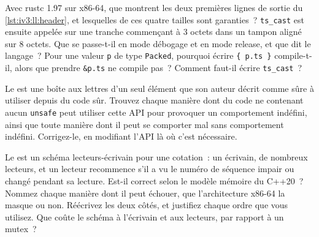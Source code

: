 \begin{question}\label{iq:iv3:low-latency:29}
Avec rustc 1.97 sur x86-64, que montrent les deux premières lignes de sortie du \cref{lst:iv3:ll:header}, et lesquelles de ces quatre tailles sont garanties~? \texttt{ts\_cast} est ensuite appelée sur une tranche commençant à 3 octets dans un tampon aligné sur 8 octets. Que se passe-t-il en mode débogage et en mode release, et que dit le langage~? Pour une valeur \texttt{p} de type \texttt{Packed}, pourquoi écrire \texttt{\{ p.ts \}} compile-t-il, alors que prendre \texttt{\&p.ts} ne compile pas~? Comment faut-il écrire \texttt{ts\_cast}~?
\label{lst:iv3:ll:header}
\end{question}

\begin{question}\label{iq:iv3:low-latency:30}
Le  est une boîte aux lettres d'un seul élément que son auteur décrit comme sûre à utiliser depuis du code sûr. Trouvez chaque manière dont du code ne contenant aucun \texttt{unsafe} peut utiliser cette API pour provoquer un comportement indéfini, ainsi que toute manière dont il peut se comporter mal sans comportement indéfini. Corrigez-le, en modifiant l'API là où c'est nécessaire.
\label{lst:iv3:ll:mailbox}
\end{question}

\begin{question}\label{iq:iv3:low-latency:31}
Le  est un schéma lecteurs-écrivain pour une cotation~: un écrivain, de nombreux lecteurs, et un lecteur recommence s'il a vu le numéro de séquence impair ou changé pendant sa lecture. Est-il correct selon le modèle mémoire du C++20~? Nommez chaque manière dont il peut échouer, que l'architecture x86-64 la masque ou non. Réécrivez les deux côtés, et justifiez chaque ordre que vous utilisez. Que coûte le schéma à l'écrivain et aux lecteurs, par rapport à un mutex~?
\label{lst:iv3:ll:seqlock}
\end{question}

